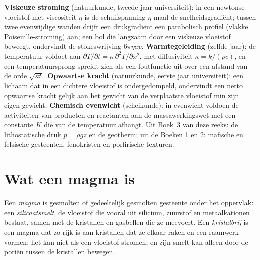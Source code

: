 \begin{recall}
\textbf{Viskeuze stroming} (natuurkunde, tweede jaar universiteit): in een newtonse vloeistof met
viscositeit $\eta$ is de schuifspanning $\eta$ maal de snelheidsgradiënt; tussen
twee evenwijdige wanden drijft een drukgradiënt een parabolisch profiel (vlakke Poiseuille-stroming)
aan; een bol die langzaam door een viskeuze vloeistof beweegt, ondervindt de stokeswrijving
$6\pi\eta a v$. \textbf{Warmtegeleiding} (zelfde jaar): de temperatuur voldoet aan
$\partial T/\partial t = \kappa\,\partial^2T/\partial x^2$, met diffusiviteit $\kappa = k/(\rho
c)$, en een temperatuursprong spreidt zich als een foutfunctie uit over een afstand van
de orde $\sqrt{\kappa t}$. \textbf{Opwaartse kracht} (natuurkunde, eerste jaar universiteit): een lichaam
dat in een dichtere vloeistof is ondergedompeld, ondervindt een netto opwaartse kracht gelijk aan het gewicht van de
verplaatste vloeistof min zijn eigen gewicht. \textbf{Chemisch evenwicht} (scheikunde): in
evenwicht voldoen de activiteiten van producten en reactanten aan de massawerkingswet
met een constante $K$ die van de temperatuur afhangt. Uit Boek~3
van deze reeks: de lithostatische druk $p = \rho g z$ en de geotherm; uit de
Boeken 1 en 2: mafische en felsische gesteenten, fenokristen en porfirische texturen.
\end{recall}

\section{Wat een magma is}

\begin{definition}[Magma]\label{def:b2:magma-emplacement:magma}
Een \emph{magma} is gesmolten of gedeeltelijk gesmolten gesteente onder het oppervlak: een
\emph{silicaatsmelt}, de vloeistof die vooral uit silicium,
zuurstof en metaalkationen bestaat, samen met de kristallen en gasbellen die ze meevoert.
Een \emph{kristalbrij} is een magma dat zo rijk is aan kristallen dat ze
elkaar raken en een raamwerk vormen: het kan niet als een vloeistof stromen, en zijn smelt kan alleen
door de poriën tussen de kristallen bewegen.
\end{definition}

